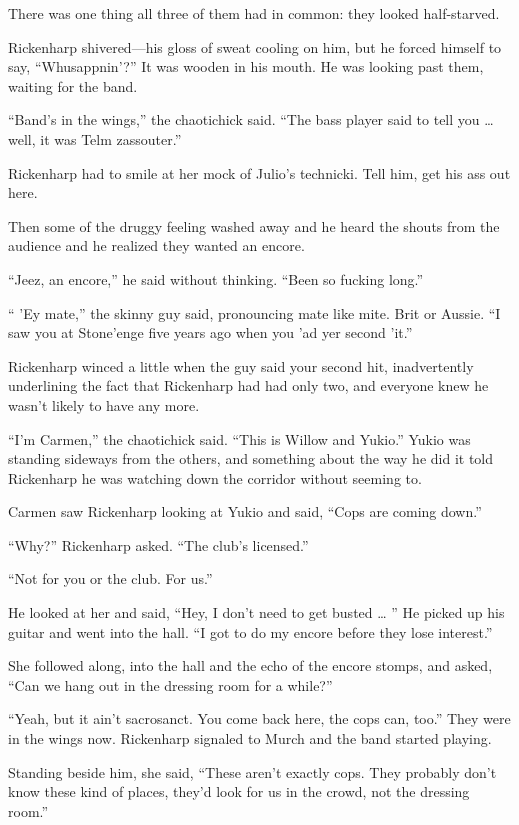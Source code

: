 There was one thing all three of them had in common: they looked half-starved.

Rickenharp shivered—his gloss of sweat cooling on him, but he forced himself to say, “Whusappnin’?” It was wooden in his mouth. He was looking past them, waiting for the band.

“Band’s in the wings,” the chaotichick said. “The bass player said to tell you … well, it was Telm zassouter.”

Rickenharp had to smile at her mock of Julio’s technicki. Tell him, get his ass out here.

Then some of the druggy feeling washed away and he heard the shouts from the audience and he realized they wanted an encore.

“Jeez, an encore,” he said without thinking. “Been so fucking long.”

“ ’Ey mate,” the skinny guy said, pronouncing mate like mite. Brit or Aussie. “I saw you at Stone’enge five years ago when you ’ad yer second ’it.”

Rickenharp winced a little when the guy said your second hit, inadvertently underlining the fact that Rickenharp had had only two, and everyone knew he wasn’t likely to have any more.

“I’m Carmen,” the chaotichick said. “This is Willow and Yukio.” Yukio was standing sideways from the others, and something about the way he did it told Rickenharp he was watching down the corridor without seeming to.

Carmen saw Rickenharp looking at Yukio and said, “Cops are coming down.”

“Why?” Rickenharp asked. “The club’s licensed.”

“Not for you or the club. For us.”

He looked at her and said, “Hey, I don’t need to get busted … ” He picked up his guitar and went into the hall. “I got to do my encore before they lose interest.”

She followed along, into the hall and the echo of the encore stomps, and asked, “Can we hang out in the dressing room for a while?”

“Yeah, but it ain’t sacrosanct. You come back here, the cops can, too.” They were in the wings now. Rickenharp signaled to Murch and the band started playing.

Standing beside him, she said, “These aren’t exactly cops. They probably don’t know these kind of places, they’d look for us in the crowd, not the dressing room.”

